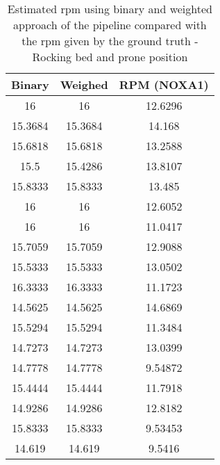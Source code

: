 \begin{table}[h]
    \centering
    \begin{tabular}{|c|c|c|}
 
    \hline 
    Binary & Weighed &RPM (NOXA1) \\ 
    \hline 
16         &    16     &   12.6296 \\ 
15.3684     &   15.3684    &     14.168 \\ 
15.6818    &    15.6818   &     13.2588 \\ 
15.5     &   15.4286    &    13.8107 \\ 
15.8333    &    15.8333    &     13.485 \\ 
16        &     16   &     12.6052 \\ 
16        &     16   &     11.0417 \\ 
15.7059    &    15.7059   &     12.9088 \\ 
15.5333    &    15.5333   &     13.0502 \\ 
16.3333    &    16.3333  &      11.1723 \\ 
14.5625     &   14.5625   &     14.6869 \\ 
15.5294    &    15.5294   &     11.3484 \\ 
14.7273    &    14.7273   &     13.0399 \\ 
14.7778    &    14.7778   &     9.54872 \\ 
15.4444     &   15.4444   &     11.7918 \\ 
14.9286    &    14.9286   &     12.8182 \\ 
15.8333    &    15.8333   &     9.53453 \\ 
14.619     &    14.619    &     9.5416 \\ 
\hline 
\end{tabular}
\caption{Estimated rpm using binary and weighted approach of the pipeline
compared with the rpm given by the ground truth
- Rocking bed and prone position}
\label{tab:ProneMov}

\end{table}
